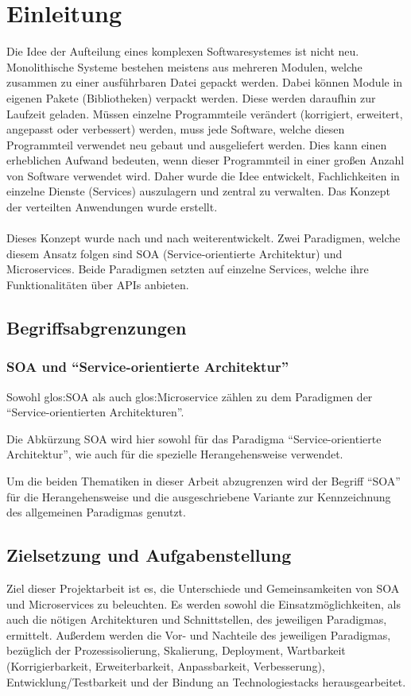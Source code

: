 \chapter{Einleitung}
\label{chap:Einleitung}
Die Idee der Aufteilung eines komplexen Softwaresystemes ist nicht neu. Monolithische Systeme bestehen meistens aus mehreren Modulen, welche zusammen zu einer ausführbaren Datei gepackt werden. Dabei können Module in eigenen Pakete (Bibliotheken) verpackt werden. Diese werden daraufhin zur Laufzeit geladen. Müssen einzelne Programmteile verändert (korrigiert, erweitert, angepasst oder verbessert) werden, muss jede Software, welche diesen Programmteil verwendet neu gebaut und ausgeliefert werden. Dies kann einen erheblichen Aufwand bedeuten, wenn dieser Programmteil in einer großen Anzahl von Software verwendet wird. Daher wurde die Idee entwickelt, Fachlichkeiten in einzelne Dienste (Services) auszulagern und zentral zu verwalten. Das Konzept der verteilten Anwendungen wurde erstellt.
\\\\
Dieses Konzept wurde nach und nach weiterentwickelt. Zwei Paradigmen, welche diesem Ansatz folgen sind SOA (Service-orientierte Architektur) und Microservices. Beide Paradigmen setzten auf einzelne Services, welche ihre Funktionalitäten über APIs anbieten.

\section{Begriffsabgrenzungen}
\label{sec:Begriffsabgrenzungen}

\subsection*{SOA und "`Service-orientierte Architektur"'}
Sowohl \gls{glos:SOA} als auch \gls{glos:Microservice} zählen zu dem Paradigmen der "`Service-orientierten Architekturen"'.

Die Abkürzung SOA wird hier sowohl für das Paradigma "`Service-orientierte Architektur"', wie auch für die spezielle Herangehensweise verwendet.

Um die beiden Thematiken in dieser Arbeit abzugrenzen wird der Begriff "`SOA"' für die Herangehensweise und die ausgeschriebene Variante zur Kennzeichnung des allgemeinen Paradigmas genutzt.

\section{Zielsetzung und Aufgabenstellung}
\label{sec:ZielsetzungUndAufgabenstellung}
Ziel dieser Projektarbeit ist es, die Unterschiede und Gemeinsamkeiten von SOA und Microservices zu beleuchten. Es werden sowohl die Einsatzmöglichkeiten, als auch die nötigen Architekturen und Schnittstellen, des jeweiligen Paradigmas, ermittelt. Außerdem werden die Vor- und Nachteile des jeweiligen Paradigmas, bezüglich der Prozessisolierung, Skalierung, Deployment, Wartbarkeit (Korrigierbarkeit, Erweiterbarkeit, Anpassbarkeit, Verbesserung), Entwicklung/Testbarkeit und der Bindung an Technologiestacks herausgearbeitet. 

